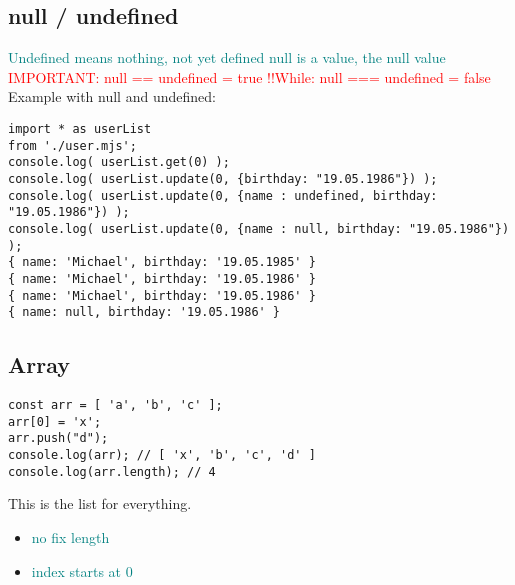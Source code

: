\documentclass[main.tex,fontsize=6pt,paper=a4,paper=landscape,DIV=calc,]{scrartcl}
\begin{document}
\begin{multicols*}{4}
\subsection{null / undefined}  
\textcolor{teal}{Undefined means nothing, not yet defined}\newline
\textcolor{teal}{null is a value, the null value}\newline
\textcolor{red}{IMPORTANT: null == undefined = true !!\newline While: null === undefined = false}\newline
Example with null and undefined:
\vspace{-2mm}
\begin{lstlisting}
import * as userList
from './user.mjs';
console.log( userList.get(0) );
console.log( userList.update(0, {birthday: "19.05.1986"}) );
console.log( userList.update(0, {name : undefined, birthday: "19.05.1986"}) );
console.log( userList.update(0, {name : null, birthday: "19.05.1986"}) );
{ name: 'Michael', birthday: '19.05.1985' }
{ name: 'Michael', birthday: '19.05.1986' }
{ name: 'Michael', birthday: '19.05.1986' }
{ name: null, birthday: '19.05.1986' }
\end{lstlisting}
\vspace{2mm}


\subsection{Array}  
\vspace{-2mm}
\begin{lstlisting}
const arr = [ 'a', 'b', 'c' ];
arr[0] = 'x';
arr.push("d");
console.log(arr); // [ 'x', 'b', 'c', 'd' ]
console.log(arr.length); // 4
\end{lstlisting}
\vspace{2mm}
This is the list for everything.\newline
\begin{itemize}
  \item \textcolor{teal}{no fix length}
  \item \textcolor{teal}{index starts at 0}
  

\end{itemize}
\end{multicols*}
\end{document}
